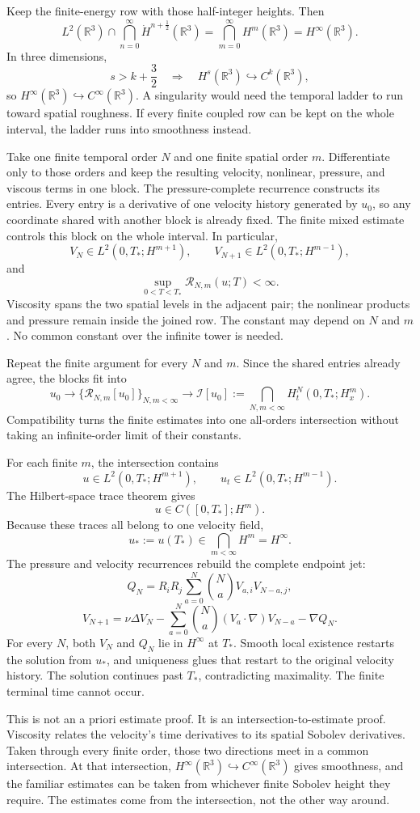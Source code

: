 \documentclass[11pt]{article}
\begin{document}
Keep the finite-energy row with those half-integer heights. Then
\[
L^2(\mathbb R^3)
\cap\bigcap_{n=0}^{\infty}\dot H^{n+\frac12}(\mathbb R^3)
=\bigcap_{m=0}^{\infty}H^m(\mathbb R^3)
=H^\infty(\mathbb R^3).
\]
In three dimensions,
\[
s>k+\frac32
\quad\Longrightarrow\quad
H^s(\mathbb R^3)\hookrightarrow C^k(\mathbb R^3),
\]
so \(H^\infty(\mathbb R^3)\hookrightarrow C^\infty(\mathbb R^3)\). A singularity would need the temporal ladder to run toward spatial roughness. If every finite coupled row can be kept on the whole interval, the ladder runs into smoothness instead.

Take one finite temporal order \(N\) and one finite spatial order \(m\). Differentiate only to those orders and keep the resulting velocity, nonlinear, pressure, and viscous terms in one block. The pressure-complete recurrence constructs its entries. Every entry is a derivative of one velocity history generated by \(u_0\), so any coordinate shared with another block is already fixed. The finite mixed estimate controls this block on the whole interval. In particular,
\[
V_N\in L^2(0,T_*;H^{m+1}),
\qquad
V_{N+1}\in L^2(0,T_*;H^{m-1}),
\]
and
\[
\sup_{0<T<T_*}\mathcal R_{N,m}(u;T)<\infty.
\]
Viscosity spans the two spatial levels in the adjacent pair; the nonlinear products and pressure remain inside the joined row. The constant may depend on \(N\) and \(m\). No common constant over the infinite tower is needed.

Repeat the finite argument for every \(N\) and \(m\). Since the shared entries already agree, the blocks fit into
\[
u_0
\longrightarrow
\{\mathcal R_{N,m}[u_0]\}_{N,m<\infty}
\longrightarrow
\mathcal I[u_0]
:=
\bigcap_{N,m<\infty}H_t^N(0,T_*;H_x^m).
\]
Compatibility turns the finite estimates into one all-orders intersection without taking an infinite-order limit of their constants.

For each finite \(m\), the intersection contains
\[
u\in L^2(0,T_*;H^{m+1}),
\qquad
u_t\in L^2(0,T_*;H^{m-1}).
\]
The Hilbert-space trace theorem gives
\[
u\in C([0,T_*];H^m).
\]
Because these traces all belong to one velocity field,
\[
u_*:=u(T_*)\in\bigcap_{m<\infty}H^m=H^\infty.
\]
The pressure and velocity recurrences rebuild the complete endpoint jet:
\[
Q_N
=R_iR_j\sum_{a=0}^{N}\binom NaV_{a,i}V_{N-a,j},
\]
\[
V_{N+1}
=\nu\Delta V_N
-\sum_{a=0}^{N}\binom Na(V_a\cdot\nabla)V_{N-a}
-\nabla Q_N.
\]
For every \(N\), both \(V_N\) and \(Q_N\) lie in \(H^\infty\) at \(T_*\). Smooth local existence restarts the solution from \(u_*\), and uniqueness glues that restart to the original velocity history. The solution continues past \(T_*\), contradicting maximality. The finite terminal time cannot occur.

This is not an a priori estimate proof. It is an intersection-to-estimate proof. Viscosity relates the velocity's time derivatives to its spatial Sobolev derivatives. Taken through every finite order, those two directions meet in a common intersection. At that intersection, \(H^\infty(\mathbb R^3)\hookrightarrow C^\infty(\mathbb R^3)\) gives smoothness, and the familiar estimates can be taken from whichever finite Sobolev height they require. The estimates come from the intersection, not the other way around.
\end{document}
